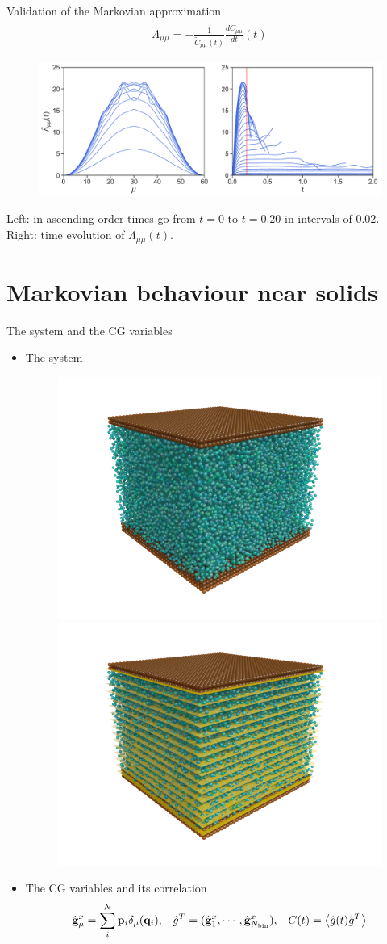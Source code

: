 \documentclass{beamer}
\newcommand{\llangle}{\left\langle}
\newcommand{\rrangle}{\right\rangle}
\begin{document}
\begin{frame}{Validation of the Markovian approximation}
\begin{align}
  \tilde{\Lambda}_{\mu\mu}=-\frac{1}{\tilde{C}_{\mu\mu}(t)}\frac{d\tilde{C}_{\mu\mu}}{dt}(t)
  \nonumber
\end{align}
\begin{figure}[h!]
\includegraphics[width=\linewidth]{LambdatFourier-PBC-defense}
\end{figure}
  Left:
  in ascending  order times  go  from $t=0$  to $t=0.20$  in
  intervals of $0.02$.  Right: time evolution of $\tilde{\Lambda}_{\mu\mu}(t)$.
\end{frame}

\section{Markovian behaviour near solids}
\begin{frame}{The system and the CG variables}
\begin{itemize}
  \item The system
\begin{figure}
    \centering
    \includegraphics[width=0.45\linewidth]{PRL3_gold2_wo_layers_wo_diffuse}
    \includegraphics[width=0.45\linewidth]{PRL3_gold2_wo_diffuse}
\end{figure}
\item The CG variables and its correlation
\begin{align}
  \hat{\bf g}^x_\mu= \sum_i^N{\bf p}_i\delta_\mu({\bf q}_i), && 
  \hat{g}^T=(\hat{\bf   g}^x_1,\cdots,\hat{\bf  g}^x_{N_{\rm   bin}}), &&
  C(t)=\llangle \hat{g}(t) \hat{g}^T\rrangle 
\nonumber
\end{align}
\end{itemize}
\end{frame}
\end{document}
